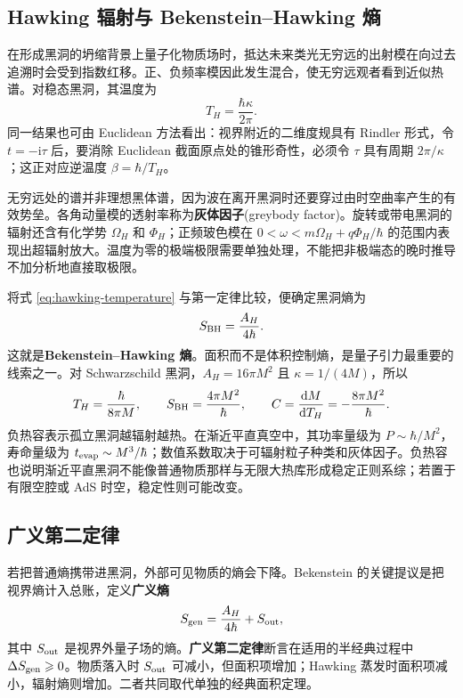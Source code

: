 \subsection{Hawking 辐射与 Bekenstein--Hawking 熵}

在形成黑洞的坍缩背景上量子化物质场时，抵达未来类光无穷远的出射模在向过去追溯时会受到指数红移。正、负频率模因此发生混合，使无穷远观者看到近似热谱。对稳态黑洞，其温度为
\begin{equation}\label{eq:hawking-temperature}
    T_H=\frac{\hbar\kappa}{2\pi}.
\end{equation}
同一结果也可由 Euclidean 方法看出：视界附近的二维度规具有 Rindler 形式，令 $t=-\mathrm{i}\tau$ 后，要消除 Euclidean 截面原点处的锥形奇性，必须令 $\tau$ 具有周期 $2\pi/\kappa$；这正对应逆温度 $\beta=\hbar/T_H$。

无穷远处的谱并非理想黑体谱，因为波在离开黑洞时还要穿过由时空曲率产生的有效势垒。各角动量模的透射率称为\textbf{灰体因子}(greybody factor)。旋转或带电黑洞的辐射还含有化学势 $\Omega_H$ 和 $\Phi_H$；正频玻色模在 $0<\omega<m\Omega_H+q\Phi_H/\hbar$ 的范围内表现出超辐射放大。温度为零的极端极限需要单独处理，不能把非极端态的晚时推导不加分析地直接取极限。

将式 \eqref{eq:hawking-temperature} 与第一定律比较，便确定黑洞熵为
\begin{equation}\label{eq:bek-hawking-entropy}
    S_{\rm BH}=\frac{A_H}{4\hbar}.
\end{equation}
这就是\textbf{Bekenstein--Hawking 熵}。面积而不是体积控制熵，是量子引力最重要的线索之一。对 Schwarzschild 黑洞，$A_H=16\pi M^2$ 且 $\kappa=1/(4M)$，所以
\begin{equation}\label{eq:schwarzschild-thermo}
    T_H=\frac{\hbar}{8\pi M},\qquad
    S_{\rm BH}=\frac{4\pi M^2}{\hbar},\qquad
    C=\dv{M}{T_H}=-\frac{8\pi M^2}{\hbar}.
\end{equation}
负热容表示孤立黑洞越辐射越热。在渐近平直真空中，其功率量级为 $P\sim\hbar/M^2$，寿命量级为 $t_{\rm evap}\sim M^3/\hbar$；数值系数取决于可辐射粒子种类和灰体因子。负热容也说明渐近平直黑洞不能像普通物质那样与无限大热库形成稳定正则系综；若置于有限空腔或 AdS 时空，稳定性则可能改变。

\subsection{广义第二定律}

若把普通熵携带进黑洞，外部可见物质的熵会下降。Bekenstein 的关键提议是把视界熵计入总账，定义\textbf{广义熵}
\begin{equation}\label{eq:generalized-entropy}
    S_{\rm gen}=\frac{A_H}{4\hbar}+S_{\rm out},
\end{equation}
其中 $S_{\rm out}$ 是视界外量子场的熵。\textbf{广义第二定律}断言在适用的半经典过程中 $\Delta S_{\rm gen}\geqslant0$。物质落入时 $S_{\rm out}$ 可减小，但面积项增加；Hawking 蒸发时面积项减小，辐射熵则增加。二者共同取代单独的经典面积定理。


